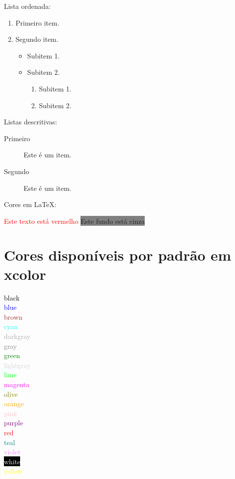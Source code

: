 \documentclass{article}
\begin{document}
	Lista ordenada:
	
	\begin{enumerate}
		\item Primeiro item.
		\item Segundo item.
		\begin{itemize}
			\item Subitem 1.
			\item Subitem 2.
			\begin{enumerate}
				\item Subitem 1.
				\item Subitem 2.
			\end{enumerate}
		\end{itemize}
		
	\end{enumerate}
	
	Listas descritivas:
	
	\begin{description}
		\item[Primeiro] Este é um item.
		\item[Segundo] Este é um item.
	\end{description}


\begin{center}
	Cores em LaTeX:
\end{center}	

\textcolor{red}{Este texto está vermelho} %
\colorbox{gray}{Este fundo está cinza} %

\section*{Cores disponíveis por padrão em xcolor}

\textcolor{black}{black}\\
\textcolor{blue}{blue}\\
\textcolor{brown}{brown}\\
\textcolor{cyan}{cyan}\\
\textcolor{darkgray}{darkgray}\\
\textcolor{gray}{gray}\\
\textcolor{green}{green}\\
\textcolor{lightgray}{lightgray}\\
\textcolor{lime}{lime}\\
\textcolor{magenta}{magenta}\\
\textcolor{olive}{olive}\\
\textcolor{orange}{orange}\\
\textcolor{pink}{pink}\\
\textcolor{purple}{purple}\\
\textcolor{red}{red}\\
\textcolor{teal}{teal}\\
\textcolor{violet}{violet}\\
\colorbox{black}{\textcolor{white}{white}}\\
\textcolor{yellow}{yellow}
\end{document}
